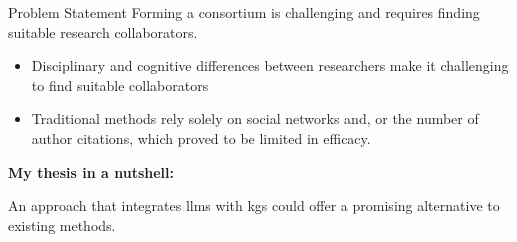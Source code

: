 \begin{tframe}{Problem Statement}
Forming a consortium is challenging and requires finding suitable research collaborators.


\vspace{.5cm}
\begin{itemize}
    \item Disciplinary and cognitive differences between researchers make it challenging to find suitable collaborators
    \vspace{.1cm}
    \item Traditional methods rely solely on social networks and, or the number of author citations, which proved to be limited in efficacy.
\end{itemize}

\vspace{.5cm}

\textbf{My thesis in a nutshell:}

\vspace{.1cm}

An approach that integrates \glspl{llm} with \glspl{kg} could offer a promising alternative to existing methods.
\end{tframe}